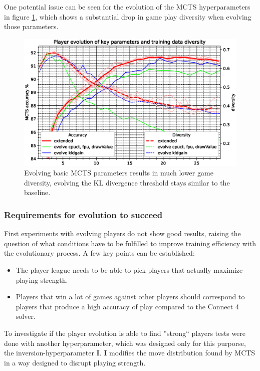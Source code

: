\documentclass[12pt,onecolumn,oneside,titlepage]{article}
\begin{document}
One potential issue can be seen for the evolution of the MCTS hyperparameters in figure \ref{fig:evolve_low_diversity}, which shows a substantial drop in game play diversity when evolving those parameters.

\begin{figure}[H]
\centering
\includegraphics[clip,width=\columnwidth]{evolve_low_diversity}
\caption{Evolving basic MCTS parameters results in much lower game diversity, evolving the KL divergence threshold stays similar to the baseline. }
\label{fig:evolve_low_diversity}
\end{figure}

\subsubsection{Requirements for evolution to succeed}

First experiments with evolving players do not show good results, raising the question of what conditions have to be fulfilled to improve training efficiency with the evolutionary process.
A few key points can be established:

\begin{itemize}
 \item The player league needs to be able to pick players that actually maximize playing strength.
 \item Players that win a lot of games against other players should correspond to players that produce a high accuracy of play compared to the Connect 4 solver.
\end{itemize}

To investigate if the player evolution is able to find ''strong`` players tests were done with another hyperparameter, which was designed only for this purporse, the inversion-hyperparameter $\mathbf{I}$.
$\mathbf{I}$ modifies the move distribution found by MCTS in a way designed to disrupt playing strength.
\end{document}
